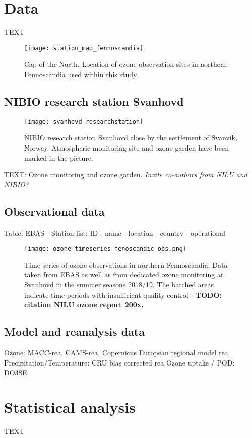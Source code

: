 \documentclass[bg, manuscript]{copernicus}
\begin{document}
\section{Data}
TEXT
\begin{figure}[t]
  \texttt{[image: station\_map\_fennoscandia]}
  \caption{Cap of the North. Location of ozone observation sites in northern Fennoscandia used within this study.}
  \label{fig:station_map_fennoscandia}
\end{figure}


\subsection{NIBIO research station Svanhovd}

\begin{figure}[t]
  \texttt{[image: svanhovd\_researchstation]}
  \caption{NIBIO research station Svanhovd close by the settlement of Svanvik, Norway. Atmospheric monitoring site and ozone garden have been marked in the picture.}
  \label{fig:svanhovd_research_station}
\end{figure}
TEXT: Ozone monitoring and ozone garden. \emph{Invite co-authors from NILU and NIBIO?}


\subsection{Observational data}
Table: EBAS - Station list: ID - name - location - country - operational
\begin{figure*}[t]
  \texttt{[image: ozone\_timeseries\_fenoscandic\_obs.png]}
  \label{fig:ozone_timesseries_fenoscandic_obs}
  \caption{Time series of ozone observations in northern Fennoscandia. Data taken from EBAS as well as from dedicated ozone monitoring at Svanhovd in the summer seasons 2018/19. The hatched areas indicate time periods with insufficient quality control - \bf{TODO: citation NILU ozone report 200x}.}
\end{figure*}



\subsection{Model and reanalysis data}
Ozone: MACC-rea, CAMS-rea, Copernicus European regional model rea
Precipitation/Temperature: CRU bias corrected rea
Ozone uptake / POD: DO3SE



\section{Statistical analysis}
TEXT
\end{document}

